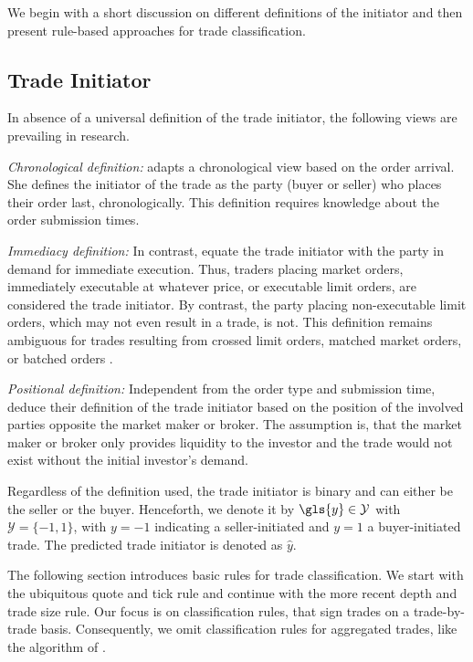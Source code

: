 We begin with a short discussion on different definitions of the initiator and then present rule-based approaches for trade classification.

\subsection{Trade Initiator}
\label{sec:trade-initiator}

In absence of a universal definition of the trade initiator, the following views are prevailing in research.

\emph{Chronological definition:} \textcite[][267]{odders-whiteOccurrenceConsequencesInaccurate2000} adapts a chronological view based on the order arrival. She defines the initiator of the trade as the party (buyer or seller) who places their order last, chronologically. This definition requires knowledge about the order submission times.

\emph{Immediacy definition:} In contrast, \textcite[][94--97]{leeInferringInvestorBehavior2000}  equate the trade initiator with the party in demand for immediate execution. Thus, traders placing market orders, immediately executable at whatever price, or executable limit orders, are considered the trade initiator. By contrast, the party placing non-executable limit orders, which may not even result in a trade, is not. This definition remains ambiguous for trades resulting from crossed limit orders, matched market orders, or batched orders  \autocite[][94--95]{leeInferringInvestorBehavior2000}.

\emph{Positional definition:} Independent from the order type and submission time, \textcite[][533]{ellisAccuracyTradeClassification2000} deduce their definition of the trade initiator based on the position of the involved parties opposite the market maker or broker. The assumption is, that the market maker or broker only provides liquidity to the investor and the trade would not exist without the initial investor's demand.

Regardless of the definition used, the trade initiator is binary and can either be the seller or the buyer. Henceforth, we denote it by $\gls{y} \in \mathcal{Y}$ with $\mathcal{Y}=\{-1,1\}$, with $y=-1$ indicating a seller-initiated and $y=1$ a buyer-initiated trade. The predicted trade initiator is denoted as $\hat{y}$.

The following section introduces basic rules for trade classification. We start with the ubiquitous quote and tick rule and continue with the more recent depth and trade size rule. Our focus is on classification rules, that sign trades on a trade-by-trade basis. Consequently, we omit classification rules for aggregated trades, like the  algorithm of \textcite[][1466--1468]{easleyFlowToxicityLiquidity2012}.

